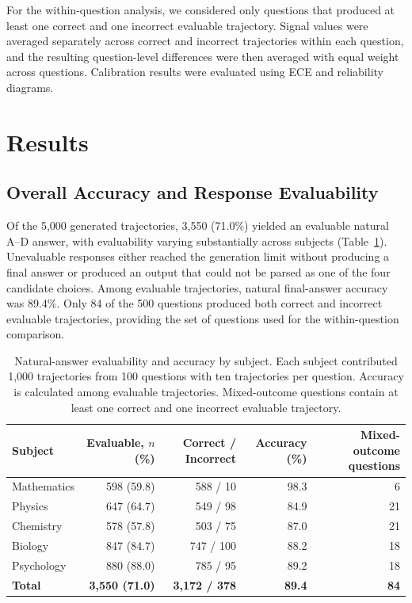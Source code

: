 \documentclass{article}
\begin{document}
For the within-question analysis, we considered only questions that produced at least one correct and one incorrect evaluable trajectory. Signal values were averaged separately across correct and incorrect trajectories within each question, and the resulting question-level differences were then averaged with equal weight across questions. Calibration results were evaluated using ECE and reliability diagrams.


\section{Results}
\label{sec:results}

\subsection{Overall Accuracy and Response Evaluability}

Of the 5{,}000 generated trajectories, 3{,}550 (71.0\%) yielded an evaluable natural A--D answer, with evaluability varying substantially across subjects (Table~\ref{tab:cohort}). Unevaluable responses either reached the generation limit without producing a final answer or produced an output that could not be parsed as one of the four candidate choices. Among evaluable trajectories, natural final-answer accuracy was 89.4\%. Only 84 of the 500 questions produced both correct and incorrect evaluable trajectories, providing the set of questions used for the within-question comparison.


\begin{table}[t]
\centering
\begin{tabular}{lrrrr}
\toprule
Subject & Evaluable, $n$ (\%) & Correct / Incorrect & Accuracy (\%) & Mixed-outcome questions \\
\midrule
Mathematics & 598 (59.8) & 588 / 10 & 98.3 & 6 \\
Physics & 647 (64.7) & 549 / 98 & 84.9 & 21 \\
Chemistry & 578 (57.8) & 503 / 75 & 87.0 & 21 \\
Biology & 847 (84.7) & 747 / 100 & 88.2 & 18 \\
Psychology & 880 (88.0) & 785 / 95 & 89.2 & 18 \\
\midrule
\textbf{Total} & \textbf{3{,}550 (71.0)} & \textbf{3{,}172 / 378} & \textbf{89.4} & \textbf{84} \\
\bottomrule
\end{tabular}

\caption{Natural-answer evaluability and accuracy by subject. Each subject contributed 1{,}000 trajectories from 100 questions with ten trajectories per question. Accuracy is calculated among evaluable trajectories. Mixed-outcome questions contain at least one correct and one incorrect evaluable trajectory.}
\label{tab:cohort}
\end{table}
\end{document}
